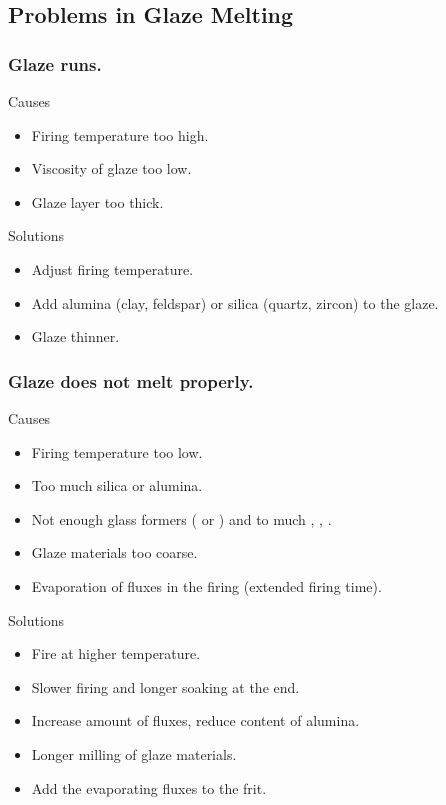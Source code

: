 \subsection{Problems in Glaze Melting}
\label{sec:problemmelt}
\subsubsection{Glaze runs.}
Causes
\begin{itemize}
\item Firing temperature too high.
\item Viscosity of glaze too low.
\item Glaze layer too thick.
\end{itemize}
Solutions
\begin{itemize}
\item Adjust firing temperature.
\item Add alumina (clay, feldspar) or silica (quartz, zircon) to the glaze.
\item Glaze thinner.
\end{itemize}
\subsubsection{Glaze does not melt properly.}
Causes
\begin{itemize}
\item Firing temperature too low.
\item Too much silica or alumina.
\item Not enough glass formers ( or ) and to much , 
, .
\item Glaze materials too coarse.
\item Evaporation of fluxes in the firing (extended firing time).
\end{itemize}
Solutions
\begin{itemize}
\item Fire at higher temperature.
\item Slower firing and longer soaking at the end.
\item Increase amount of fluxes, reduce content of alumina.
\item Longer milling of glaze materials.
\item Add the evaporating fluxes to the frit.
\end{itemize}
